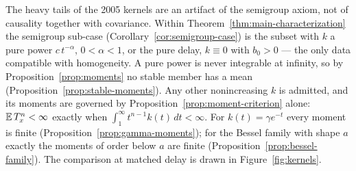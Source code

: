 

\begin{remark}\label{rem:heavy-tails}
The heavy tails of the 2005 kernels are an artifact of the semigroup axiom, not of causality
together with covariance. Within Theorem~\ref{thm:main-characterization} the semigroup sub-case
(Corollary~\ref{cor:semigroup-case}) is the subset with $k$ a pure power $c\,t^{-\alpha}$,
$0 < \alpha < 1$, or the pure delay, $k \equiv 0$ with $b_0 > 0$ --- the only data compatible
with homogeneity. A pure power is never integrable at infinity, so by
Proposition~\ref{prop:moments} no stable member has a mean (Proposition~\ref{prop:stable-moments}). Any other nonincreasing $k$ is
admitted, and its moments are governed by Proposition~\ref{prop:moment-criterion} alone:
$\mathbb{E}\,T_x^n < \infty$ exactly when $\int_1^\infty t^{n-1}k(t)\,dt < \infty$. For
$k(t) = \gamma e^{-t}$ every moment is finite (Proposition~\ref{prop:gamma-moments}); for
the Bessel family with shape $a$ exactly the moments of order below $a$ are finite
(Proposition~\ref{prop:bessel-family}). The comparison at matched delay is drawn in
Figure~\ref{fig:kernels}.
\end{remark}


